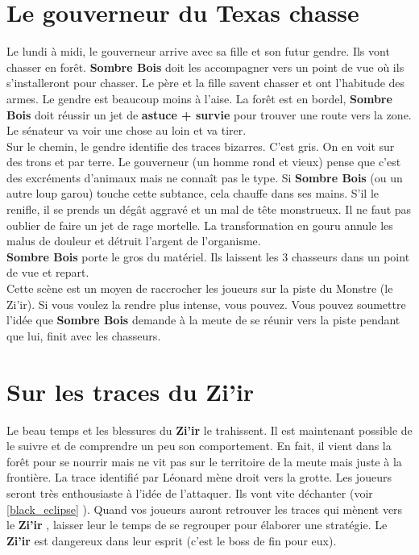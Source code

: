 \documentclass[oneside,12pt]{book}
\newcommand{\Leonard}{\textbf{Sombre Bois} }
\newcommand{\Thomas}{\textbf{Zi'ir} }
\begin{document}
\begin{flushleft}
\section{Le gouverneur du Texas chasse}
Le lundi à midi, le gouverneur arrive avec sa fille et son futur gendre. Ils vont chasser en forêt. \Leonard doit les accompagner vers un point de vue où ils s'installeront pour chasser. Le père et la fille savent chasser et ont l'habitude des armes. Le gendre est beaucoup moins à l'aise. 
La forêt est en bordel, \Leonard doit réussir un jet de \textbf{astuce + survie} pour trouver une route vers la zone. \\
Le sénateur va voir une chose au loin et va tirer. \\
Sur le chemin, le gendre identifie des traces bizarres. C'est gris. On en voit sur des trons et par terre. Le gouverneur (un homme rond et vieux) pense que c'est des excréments d'animaux mais ne connaît pas le type. Si \Leonard (ou un autre loup garou) touche cette subtance, cela chauffe dans ses mains. S'il le renifle, il se prends un dégât aggravé et un mal de tête monstrueux. Il ne faut pas oublier de faire un jet de rage mortelle. La transformation en gouru annule les malus de douleur et détruit l'argent de l'organisme.\\
\Leonard porte le gros du matériel. Ils laissent les 3 chasseurs dans un point de vue et repart.\\
Cette scène est un moyen de raccrocher les joueurs sur la piste du Monstre (le Zi'ir). Si vous voulez la rendre plus intense, vous pouvez. Vous pouvez soumettre l'idée que \Leonard demande à la meute de se réunir vers la piste pendant que lui, finit avec les chasseurs. 


\section{Sur les traces du \Thomas}
Le beau temps et les blessures du \Thomas le trahissent. Il est maintenant possible de le suivre et de comprendre un peu son comportement. En fait, il vient dans la forêt pour se nourrir mais ne vit pas sur le territoire de la meute mais juste à la frontière. La trace identifié par Léonard mène droit vers la grotte. Les joueurs seront très enthousiaste à l'idée de l'attaquer.
Ils vont vite déchanter (voir \ref{black_eclipse} ). 
Quand vos joueurs auront retrouver les traces qui mènent vers le \Thomas, laisser leur le temps de se regrouper pour élaborer une stratégie. Le \Thomas est dangereux dans leur esprit (c'est le boss de fin pour eux). 


\end{flushleft}
\end{document}
